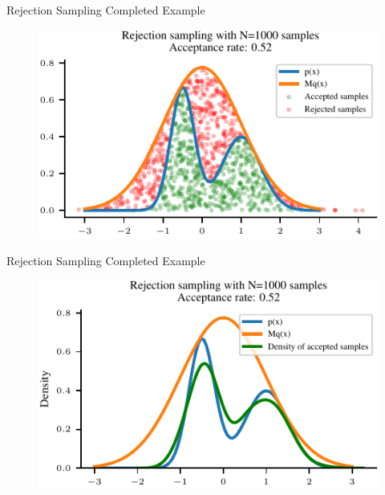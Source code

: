 \documentclass[handout]{beamer}
\begin{document}
    \begin{frame}{Rejection Sampling Completed Example}
        \begin{figure}
            \centering
            \includegraphics{../figures/sampling/rejection-sampling-N1000-False.pdf}
        \end{figure}
    \end{frame}

    \begin{frame}{Rejection Sampling Completed Example}
        \begin{figure}
            \centering
            \includegraphics{../figures/sampling/rejection-sampling-N1000-True.pdf}
        \end{figure}
    \end{frame}
\end{document}
